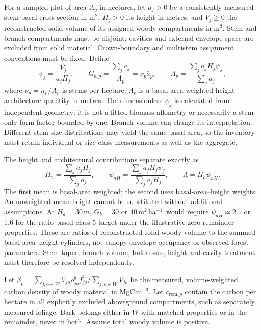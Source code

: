 \documentclass[11pt,a4paper]{article}
\theoremstyle{remark}
\begin{document}
For a sampled plot of area $A_p$ in hectares, let $a_j>0$ be a consistently measured stem basal cross-section in m$^2$, $H_j>0$ its height in metres, and $V_j\geq0$ the reconstructed solid volume of its assigned woody compartments in m$^3$. Stem and branch compartments must be disjoint; cavities and external envelope space are excluded from solid material. Crown-boundary and multistem assignment conventions must be fixed. Define
\begin{equation}
 \psi_j=\frac{V_j}{a_jH_j},\qquad
 G_{b,p}=\frac{\sum_j a_j}{A_p}=\nu_p\bar a_p,\qquad
 \Lambda_p=\frac{\sum_j a_jH_j\psi_j}{\sum_j a_j},
 \label{eq:standgeometry}
\end{equation}
where $\nu_p=n_p/A_p$ is stems per hectare. $\Lambda_p$ is a basal-area-weighted height--architecture quantity in metres. The dimensionless $\psi_j$ is calculated from independent geometry; it is not a fitted biomass allometry or necessarily a stem-only form factor bounded by one. Branch volume can change its interpretation. Different stem-size distributions may yield the same basal area, so the inventory must retain individual or size-class measurements as well as the aggregate.

The height and architectural contributions separate exactly as
\[
 \bar H_a=\frac{\sum_j a_jH_j}{\sum_j a_j},\qquad
 \bar\psi_{aH}=\frac{\sum_j a_jH_j\psi_j}{\sum_j a_jH_j},
 \qquad \Lambda=\bar H_a\bar\psi_{aH}.
\]
The first mean is basal-area weighted; the second uses basal-area--height weights. An unweighted mean height cannot be substituted without additional assumptions. At $\bar H_a=30$\,m, $G_b=30$ or 40\,m$^2$\,ha$^{-1}$\ would require $\bar\psi_{aH}\simeq2.1$ or 1.6 for the ratio-based class-5 target under the illustrative zero-remainder properties. These are ratios of reconstructed solid woody volume to the summed basal-area--height cylinders, not canopy-envelope occupancy or observed forest parameters. Stem taper, branch volume, buttresses, height and cavity treatment must therefore be resolved independently.

Let $\beta_p=\sum_{j,o\in W}V_{jo}\rho^b_{jo}f^C_{jo}/\sum_{j,o\in W}V_{jo}$ be the measured, volume-weighted carbon density of woody material in MgC\,m$^{-3}$. Let $c_{\mathrm{rem},p}$ contain the carbon per hectare in all explicitly excluded aboveground compartments, such as separately measured foliage. Bark belongs either in $W$ with matched properties or in the remainder, never in both. Assume total woody volume is positive.
\end{document}
